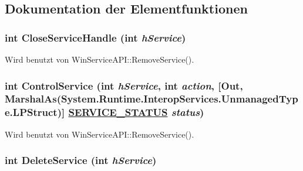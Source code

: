 \subsection{Dokumentation der Elementfunktionen}
\hypertarget{classQbeSAS_1_1WinServiceAPI_QbeSAS_1_1WinServiceAPId5}{
\subsubsection[CloseServiceHandle]{\setlength{\rightskip}{0pt plus 5cm}int Close\-Service\-Handle (int {\em h\-Service})}}
\label{classQbeSAS_1_1WinServiceAPI_QbeSAS_1_1WinServiceAPId5}




Wird benutzt von Win\-Service\-API::Remove\-Service().\hypertarget{classQbeSAS_1_1WinServiceAPI_QbeSAS_1_1WinServiceAPId2}{
\subsubsection[ControlService]{\setlength{\rightskip}{0pt plus 5cm}int Control\-Service (int {\em h\-Service}, int {\em action}, \mbox{[}Out, Marshal\-As(System.Runtime.Interop\-Services.Unmanaged\-Type.LPStruct)\mbox{]} \hyperlink{classQbeSAS_1_1WinServiceAPI_1_1SERVICE__STATUS}{SERVICE\_\-STATUS} {\em status})}}
\label{classQbeSAS_1_1WinServiceAPI_QbeSAS_1_1WinServiceAPId2}




Wird benutzt von Win\-Service\-API::Remove\-Service().\hypertarget{classQbeSAS_1_1WinServiceAPI_QbeSAS_1_1WinServiceAPId4}{
\subsubsection[DeleteService]{\setlength{\rightskip}{0pt plus 5cm}int Delete\-Service (int {\em h\-Service})}}
\label{classQbeSAS_1_1WinServiceAPI_QbeSAS_1_1WinServiceAPId4}




